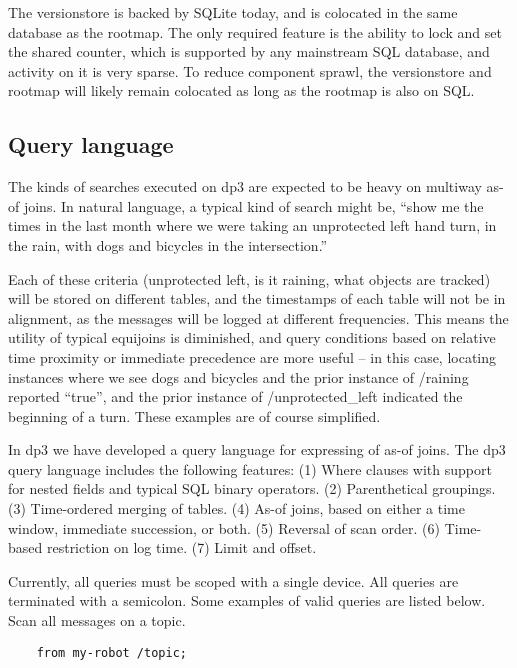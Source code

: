 \documentclass[9pt,twocolumn]{article}
\newcommand{\q}[1]{``#1''}
\begin{document}
    The versionstore is backed by SQLite today, and is colocated in the same
    database as the rootmap. The only required feature is the ability to lock and
    set the shared counter, which is supported by any mainstream SQL database,
    and activity on it is very sparse. To reduce component sprawl, the
    versionstore and rootmap will likely remain colocated as long as the rootmap
    is also on SQL.

    \subsection{Query language} \label{querylang}
    The kinds of searches executed on dp3 are expected to be heavy on multiway
    as-of joins. In natural language, a typical kind of search might be, \q{show me
    the times in the last month where we were taking an unprotected left hand turn,
    in the rain, with dogs and bicycles in the intersection.}

    Each of these criteria (unprotected left, is it raining, what objects are
    tracked) will be stored on different tables, and the timestamps of each table
    will not be in alignment, as the messages will be logged at different
    frequencies. This means the utility of typical equijoins is diminished, and
    query conditions based on relative time proximity or immediate precedence are
    more useful – in this case, locating instances where we see dogs and bicycles
    and the prior instance of /raining reported \q{true}, and the prior instance of
    /unprotected\_left indicated the beginning of a turn. These examples are of
    course simplified.

    In dp3 we have developed a query language for expressing of as-of joins.
    The dp3 query language includes the following features: (1) Where clauses
    with support for nested fields and typical SQL binary operators. (2)
    Parenthetical groupings. (3) Time-ordered merging of tables. (4) As-of
    joins, based on either a time window, immediate succession, or both. (5)
    Reversal of scan order. (6) Time-based restriction on log time. (7) Limit
    and offset.

    Currently, all queries must be scoped with a single device. All queries are
    terminated with a semicolon. Some examples of valid queries are listed below. \\

    Scan all messages on a topic.
    \begin{lstlisting}
    from my-robot /topic;
    \end{lstlisting}
\end{document}
